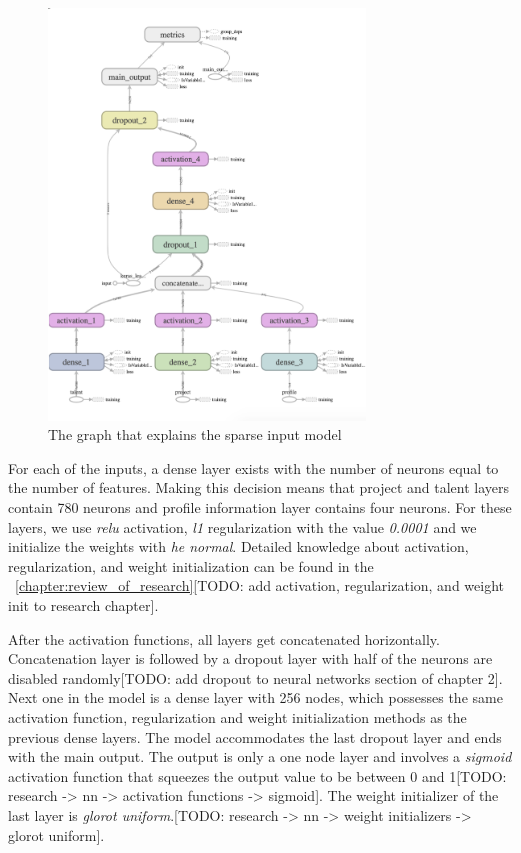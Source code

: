  \begin{figure}[!ht]
	\centering
	\includegraphics[width=0.75\textwidth]{figures/TensorBoardSparseCropped.png}
	\caption{The graph that explains the sparse input model}
	\label{fig:tensor-board-sparse}
\end{figure}

For each of the inputs, a dense layer exists with the number of neurons equal to the number of features. Making this decision means that project and talent layers contain 780 neurons and profile information layer contains four neurons. For these layers, we use \textit{relu} activation, \textit{l1} regularization with the value \textit{0.0001} and we initialize the weights with \textit{he normal}. Detailed knowledge about activation, regularization, and weight initialization can be found in the ~\autoref{chapter:review_of_research}[TODO: add activation, regularization, and weight init to research chapter].



After the activation functions, all layers get concatenated horizontally. Concatenation layer is followed by a dropout layer with half of the neurons are disabled randomly[TODO: add dropout to neural networks section of chapter 2]. Next one in the model is a dense layer with 256 nodes, which possesses the same activation function, regularization and weight initialization methods as the previous dense layers. The model accommodates the last dropout layer and ends with the main output. The output is only a one node layer and involves a \textit{sigmoid} activation function that squeezes the output value to be between 0 and 1[TODO: research -> nn -> activation functions -> sigmoid]. The weight initializer of the last layer is \textit{glorot uniform}.[TODO: research -> nn -> weight initializers -> glorot uniform].

